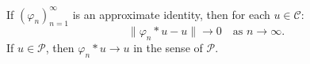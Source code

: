 If $(\varphi_n)_{n=1}^{\infty}$ is an approximate identity, then for each $u \in \mathcal{C}$:
\[
\|\varphi_n * u - u\| \to 0 \quad \text{as } n \to \infty.
\]
If $u \in \mathcal{P}$, then $\varphi_n * u \to u$ in the sense of $\mathcal{P}$.

